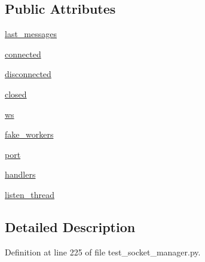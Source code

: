 \subsection*{Public Attributes}
\begin{DoxyCompactItemize}
\item 
\hyperlink{classparlai_1_1mturk_1_1core_1_1dev_1_1test_1_1test__socket__manager_1_1MockSocket_a4d7f682c2d9b7d27d6beb0be137ea2d8}{last\+\_\+messages}
\item 
\hyperlink{classparlai_1_1mturk_1_1core_1_1dev_1_1test_1_1test__socket__manager_1_1MockSocket_a8ebed74b345c2306791b66efc2856a62}{connected}
\item 
\hyperlink{classparlai_1_1mturk_1_1core_1_1dev_1_1test_1_1test__socket__manager_1_1MockSocket_a2e726e2d4aaddc4d632a21404c4e1cca}{disconnected}
\item 
\hyperlink{classparlai_1_1mturk_1_1core_1_1dev_1_1test_1_1test__socket__manager_1_1MockSocket_aba2720031044615f0f74c244b74ad7b9}{closed}
\item 
\hyperlink{classparlai_1_1mturk_1_1core_1_1dev_1_1test_1_1test__socket__manager_1_1MockSocket_a8385cc55fc0f333107bea6c821796ec6}{ws}
\item 
\hyperlink{classparlai_1_1mturk_1_1core_1_1dev_1_1test_1_1test__socket__manager_1_1MockSocket_aef7b59d1ca5b11eed188db24a79b9f6b}{fake\+\_\+workers}
\item 
\hyperlink{classparlai_1_1mturk_1_1core_1_1dev_1_1test_1_1test__socket__manager_1_1MockSocket_a8410e0042f22616ab8fe2dbd85ec26a2}{port}
\item 
\hyperlink{classparlai_1_1mturk_1_1core_1_1dev_1_1test_1_1test__socket__manager_1_1MockSocket_ae22f9969f47ace2a3ed469d37f2d2d60}{handlers}
\item 
\hyperlink{classparlai_1_1mturk_1_1core_1_1dev_1_1test_1_1test__socket__manager_1_1MockSocket_ac489f729d97f50550ce6957647e33c9e}{listen\+\_\+thread}
\end{DoxyCompactItemize}


\subsection{Detailed Description}


Definition at line 225 of file test\+\_\+socket\+\_\+manager.\+py.



